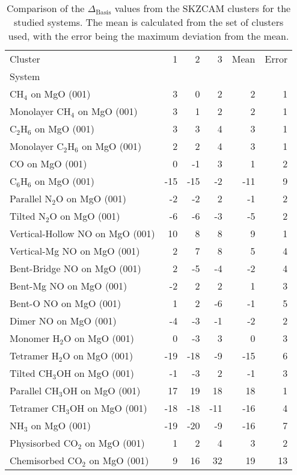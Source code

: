 \begin{table}
\caption{\label{tab:deltabasis}Comparison of the $\Delta_\textrm{Basis}$ values from the SKZCAM clusters for the studied systems. The mean is calculated from the set of clusters used, with the error being the maximum deviation from the mean.}
\begin{adjustbox}{center,max width=1\textwidth}
\begin{tabular}{lrrrrr}
\toprule
Cluster & 1 & 2 & 3 & Mean & Error \\ 
System &  &  &  &  &  \\
\midrule
CH$_4$ on MgO (001) & 3 & 0 & 2 & 2 & 1 \\
Monolayer CH$_4$ on MgO (001) & 3 & 1 & 2 & 2 & 1 \\
C$_2$H$_6$ on MgO (001) & 3 & 3 & 4 & 3 & 1 \\
Monolayer C$_2$H$_6$ on MgO (001) & 2 & 2 & 4 & 3 & 1 \\
CO on MgO (001) & 0 & -1 & 3 & 1 & 2 \\
C$_6$H$_6$ on MgO (001) & -15 & -15 & -2 & -11 & 9 \\
Parallel N$_2$O on MgO (001) & -2 & -2 & 2 & -1 & 2 \\
Tilted N$_2$O on MgO (001) & -6 & -6 & -3 & -5 & 2 \\
Vertical-Hollow NO on MgO (001) & 10 & 8 & 8 & 9 & 1 \\
Vertical-Mg NO on MgO (001) & 2 & 7 & 8 & 5 & 4 \\
Bent-Bridge NO on MgO (001) & 2 & -5 & -4 & -2 & 4 \\
Bent-Mg NO on MgO (001) & -2 & 2 & 2 & 1 & 3 \\
Bent-O NO on MgO (001) & 1 & 2 & -6 & -1 & 5 \\
Dimer NO on MgO (001) & -4 & -3 & -1 & -2 & 2 \\
Monomer H$_2$O on MgO (001) & 0 & -3 & 3 & 0 & 3 \\
Tetramer H$_2$O on MgO (001) & -19 & -18 & -9 & -15 & 6 \\
Tilted CH$_3$OH on MgO (001) & -1 & -3 & 2 & -1 & 3 \\
Parallel CH$_3$OH on MgO (001) & 17 & 19 & 18 & 18 & 1 \\
Tetramer CH$_3$OH on MgO (001) & -18 & -18 & -11 & -16 & 4 \\
NH$_3$ on MgO (001) & -19 & -20 & -9 & -16 & 7 \\
Physisorbed CO$_2$ on MgO (001) & 1 & 2 & 4 & 3 & 2 \\
Chemisorbed CO$_2$ on MgO (001) & 9 & 16 & 32 & 19 & 13 \\

\end{tabular}
\end{adjustbox}
\end{table}
